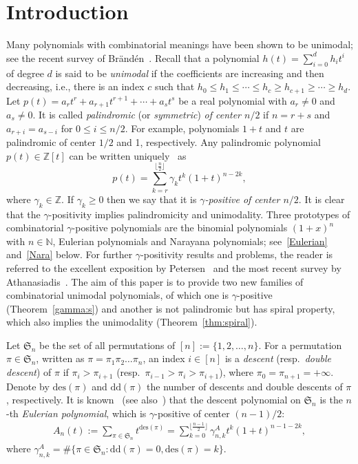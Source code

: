 \documentclass[12pt]{amsart}
\numberwithin{equation}{section}
\theoremstyle{plain}
\theoremstyle{definition}
\newcommand{\N}{\mathbb{N}}
\newcommand{\Z}{\mathbb{Z}}
\def\dd{\mathrm{dd}}
\def\des{\mathrm{des}}
\def\S{\mathfrak{S}}
\begin{document}
\section{Introduction}
 Many polynomials with combinatorial meanings have been shown to be unimodal; 
see the recent survey of Br\"and\'en~\cite{bran}. Recall that a polynomial $h(t)=\sum_{i=0}^dh_it^i$ of degree $d$ is said to be {\em unimodal} if the coefficients are increasing 
and then decreasing, i.e., there is an index $c$ such that
$
h_0\leq h_1\leq \cdots\leq h_c\geq h_{c+1}\geq\cdots\geq h_d.
$
Let $p(t)=a_rt^r+a_{r+1}t^{r+1}+\cdots +a_{s} t^{s}$ be a real polynomial with $a_r\neq0$ and $a_s\neq0$. It is called  \emph{palindromic}   (or \emph{symmetric}) {\em of center $n/2$}  if $n=r+s$ and $a_{r+i}=a_{s-i}$ for $0\leq i\leq n/2$. For example,
 polynomials $1+t$ and $t$ are palindromic of center  $1/2$ and 1, respectively.
Any palindromic  polynomial $p(t)\in \Z[t]$  can be written uniquely~\cite{bran,swz} as
  $$
p(t)=\sum_{k=r}^{\lfloor\frac{n}{2}\rfloor}\gamma_{k}t^k(1+t)^{n-2k},
$$
where $\gamma_{k}\in\Z$. If $\gamma_{k}\geq 0$ then we say that it is 
 {\em $\gamma$-positive of  center $n/2$}.
It is clear  that the 
$\gamma$-positivity implies palindromicity and unimodality. 
Three prototypes  of combinatorial $\gamma$-positive  polynomials are the binomial polynomials $(1+x)^n$ with $n\in \N$, Eulerian polynomials and Narayana polynomials; see~\eqref{Eulerian} and~\eqref{Nara} below. 
For further $\gamma$-positivity results and problems, the reader is referred to the excellent exposition by Petersen~\cite{Pet} and  the most recent survey
 by Athanasiadis~\cite{Ath}.
The aim of this paper is to provide two new families of combinatorial unimodal 
polynomials,  of which one is $\gamma$-positive (Theorem~\ref{gamma:s}) and another is not palindromic but  has spiral property, which also implies  the unimodality (Theorem~\ref{thm:spiral}).


Let  $\S_n$ be the set of all permutations of $[n]:=\{1,2,\ldots,n\}$. For a permutation $\pi\in\S_n$, written as 
$\pi=\pi_1\pi_2\ldots \pi_n$,
an index $i\in [n]$ is a {\em descent} (resp.~\emph{double descent}) 
of $\pi$ if $\pi_i>\pi_{i+1}$ (resp.~$\pi_{i-1}>\pi_i>\pi_{i+1}$), where 
$\pi_0=\pi_{n+1}=+\infty$. 
Denote by $\des(\pi)$ and $\dd(\pi)$ the number of descents and double descents of $\pi$, respectively.
It is known~\cite{fs, Pet} (see also~\cite{linzen15})  that   the 
descent polynomial on $\S_n$  is the $n$-th {\em Eulerian polynomial}, which is $\gamma$-positive of center  $(n-1)/2$:
\begin{align}\label{Eulerian}
A_n(t):=\sum_{\pi\in\S_n}t^{\des(\pi)}=\sum_{k=0}^{\lfloor\frac{n-1}{2}\rfloor}\gamma_{n,k}^A t^k(1+t)^{n-1-2k},
\end{align}
 where  $\gamma_{n,k}^A=\#\{\pi\in \S_n: \dd(\pi)=0,  \des(\pi)=k\}$.
\end{document}

